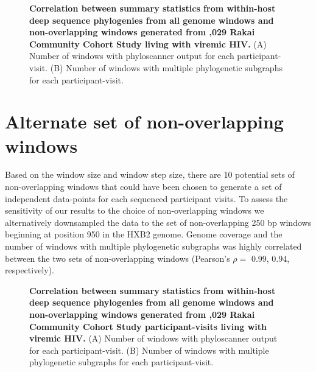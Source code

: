 \documentclass[10pt,letterpaper]{article}
\begin{document}
\begin{figure}[!ht]
\caption{{\bf Correlation between summary statistics from within-host deep sequence phylogenies from all genome windows and non-overlapping windows generated from ,029 Rakai Community Cohort Study living with viremic HIV.} (A) Number of windows with phyloscanner output for each participant-visit. (B) Number of windows with multiple phylogenetic subgraphs for each participant-visit.}
\label{all_uniq_corr}
\end{figure}


\section{Alternate set of non-overlapping windows}
Based on the window size and window step size, there are 10 potential sets of non-overlapping windows that could have been chosen to generate a set of independent data-points for each sequenced participant visits. To assess the sensitivity of our results to the choice of non-overlapping windows we alternatively downsampled the data to the set of non-overlapping 250 bp windows beginning at position 950 in the HXB2 genome. Genome coverage and the number of windows with multiple phylogenetic subgraphs was highly correlated between the two sets of non-overlapping windows (Pearson's $\rho=$ 0.99, 0.94, respectively).

\begin{figure}[!ht]
\caption{{\bf Correlation between summary statistics from within-host deep sequence phylogenies from all genome windows and non-overlapping windows generated from ,029 Rakai Community Cohort Study participant-visits living with viremic HIV.} (A) Number of windows with phyloscanner output for each participant-visit. (B) Number of windows with multiple phylogenetic subgraphs for each participant-visit.}
\label{uniq_uniq_alt_corr}
\end{figure}
\end{document}
